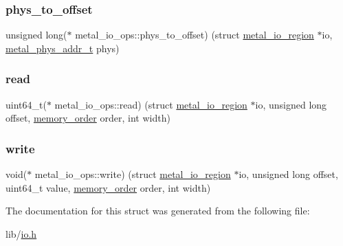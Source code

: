 \mbox{\label{structmetal__io__ops_a4f7597eddef002c9a66eb042179c016c}} 
\subsubsection{\texorpdfstring{phys\+\_\+to\+\_\+offset}{phys\_to\_offset}}
{\footnotesize\ttfamily unsigned long($\ast$ metal\+\_\+io\+\_\+ops\+::phys\+\_\+to\+\_\+offset) (struct \hyperlink{structmetal__io__region}{metal\+\_\+io\+\_\+region} $\ast$io, \hyperlink{group__system_gae024fa10b72199a3e26c29b6eb97df5d}{metal\+\_\+phys\+\_\+addr\+\_\+t} phys)}

\mbox{\label{structmetal__io__ops_a3cba7140674cb2eeb9fc74ad614ea9fb}} 
\subsubsection{\texorpdfstring{read}{read}}
{\footnotesize\ttfamily uint64\+\_\+t($\ast$ metal\+\_\+io\+\_\+ops\+::read) (struct \hyperlink{structmetal__io__region}{metal\+\_\+io\+\_\+region} $\ast$io, unsigned long offset, \hyperlink{compiler_2gcc_2atomic_8h_a17c2de5ae768960284c047a320f17d1b}{memory\+\_\+order} order, int width)}

\mbox{\label{structmetal__io__ops_a322ff06f9ee06132d4008d2578b2ef68}} 
\subsubsection{\texorpdfstring{write}{write}}
{\footnotesize\ttfamily void($\ast$ metal\+\_\+io\+\_\+ops\+::write) (struct \hyperlink{structmetal__io__region}{metal\+\_\+io\+\_\+region} $\ast$io, unsigned long offset, uint64\+\_\+t value, \hyperlink{compiler_2gcc_2atomic_8h_a17c2de5ae768960284c047a320f17d1b}{memory\+\_\+order} order, int width)}



The documentation for this struct was generated from the following file\+:\begin{DoxyCompactItemize}
\item 
lib/\hyperlink{io_8h}{io.\+h}\end{DoxyCompactItemize}
